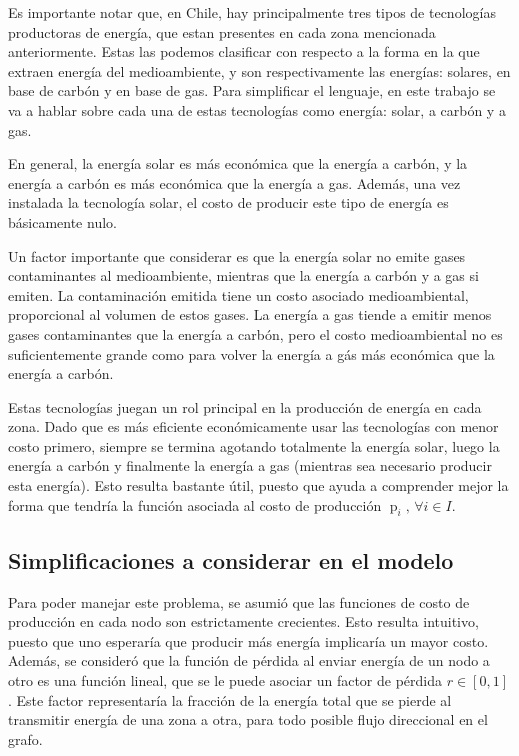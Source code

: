 \documentclass[12pt,twoside]{article}
\begin{document}
	\hspace{1cm} Es importante notar que, en Chile, hay principalmente tres tipos de tecnolog\'ias productoras de energ\'ia, que estan presentes en cada zona mencionada anteriormente. Estas las podemos clasificar con respecto a la forma en la que extraen energ\'ia del medioambiente, y son respectivamente las energ\'ias: solares, en base de carb\'on y en base de gas. Para simplificar el lenguaje, en este trabajo se va a hablar sobre cada una de estas tecnolog\'ias como energ\'ia: solar, a carb\'on y a gas.
	
	\hspace{1cm} En general, la energ\'ia solar es m\'as econ\'omica que la energ\'ia a carb\'on, y la energ\'ia a carb\'on es m\'as econ\'omica que la energ\'ia a gas. Adem\'as, una vez instalada la tecnolog\'ia solar, el costo de producir este tipo de energ\'ia es b\'asicamente nulo.
	
	\hspace{1cm} Un factor importante que considerar es que la energ\'ia solar no emite gases contaminantes al medioambiente, mientras que la energ\'ia a carb\'on y a gas si emiten. La contaminaci\'on emitida tiene un costo asociado medioambiental, proporcional al volumen de estos gases. La energ\'ia a gas tiende a emitir menos gases contaminantes que la energ\'ia a carb\'on, pero el costo medioambiental no es suficientemente grande como para volver la energ\'ia a g\'as m\'as econ\'omica que la energ\'ia a carb\'on.
	
	\hspace{1cm} Estas tecnolog\'ias juegan un rol principal en la producci\'on de energ\'ia en cada zona. Dado que es m\'as eficiente econ\'omicamente usar las tecnolog\'ias con menor costo primero, siempre se termina agotando totalmente la energ\'ia solar, luego la energ\'ia a carb\'on y finalmente la energ\'ia a gas (mientras sea necesario producir esta energ\'ia). Esto resulta bastante \'util, puesto que ayuda a comprender mejor la forma que tendr\'ia la funci\'on asociada al costo de producci\'on \(\operatorname{p}_i,\,\forall i\in I\).
	
	\newpage
	
	\subsection{Simplificaciones a considerar en el modelo}
	\hspace{1cm} Para poder manejar este problema, se asumi\'o que las funciones de costo de producci\'on en cada nodo son estrictamente crecientes. Esto resulta intuitivo, puesto que uno esperar\'ia que producir m\'as energ\'ia implicar\'ia un mayor costo. Adem\'as, se consider\'o que la funci\'on de p\'erdida al enviar energ\'ia de un nodo a otro es una funci\'on lineal, que se le puede asociar un factor de p\'erdida \(r\in[0,1]\). Este factor representar\'ia la fracci\'on de la energ\'ia total que se pierde al transmitir energ\'ia de una zona a otra, para todo posible flujo direccional en el grafo.
	
\end{document}
